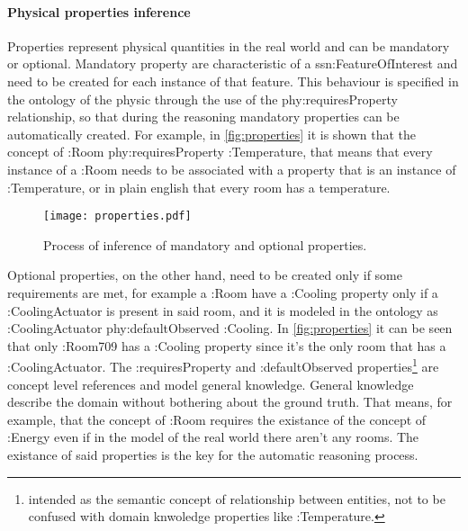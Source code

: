 \paragraph{Physical properties inference}
Properties represent physical quantities in the real world and can be mandatory or optional. Mandatory property are characteristic of a ssn:FeatureOfInterest and need to be created for each instance of that feature. This behaviour is specified in the ontology of the physic through the use of the phy:requiresProperty relationship, so that during the reasoning mandatory properties can be automatically created. For example, in \autoref{fig:properties} it is shown that the concept of :Room phy:requiresProperty :Temperature, that means that every instance of a :Room needs to be associated with a property that is an instance of :Temperature, or in plain english that every room has a temperature.
\begin{figure}
  \centering
  \texttt{[image: properties.pdf]}
  \caption{Process of inference of mandatory and optional properties.}
  \label{fig:properties}
\end{figure}
Optional properties, on the other hand, need to be created only if some requirements are met, for example a :Room have a :Cooling property only if a :CoolingActuator is present in said room, and it is modeled in the ontology as :CoolingActuator phy:defaultObserved :Cooling. In \autoref{fig:properties} it can be seen that only :Room709 has a :Cooling property since it's the only room that has a :CoolingActuator.
The :requiresProperty and :defaultObserved properties\footnote{intended as the semantic concept of relationship between entities, not to be confused with domain knwoledge properties like :Temperature.} are concept level references and model general knowledge. General knowledge describe the domain without bothering about the ground truth. That means, for example, that the concept of :Room requires the existance of the concept of :Energy even if in the model of the real world there aren't any rooms. The existance of said properties is the key for the automatic reasoning process.

